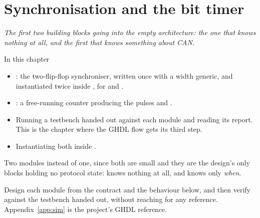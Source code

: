 
\chapter{Synchronisation and the bit timer}
\label{c12:ch}

{\large\itshape The first two building blocks going into the empty architecture: the one that knows
nothing at all, and the first that knows something about CAN.\par}

\begin{chapterbox}{In this chapter}
\begin{itemize}
  \item {}: the two-flip-flop synchroniser, written once with a width generic, and
    instantiated twice inside , for  and .
  \item {}: a free-running counter producing the pulses  and
    .
  \item Running a testbench handed out against each module and reading its report. This is the
    chapter where the GHDL flow gets its third step.
  \item Instantiating both inside .
\end{itemize}
\end{chapterbox}

Two modules instead of one, since both are small and they are the design's only blocks holding no
protocol state:  knows nothing at all, and  knows only \emph{when}.

Design each module from the contract and the behaviour below, and then verify against the testbench
handed out, without reaching for any reference. Appendix~\ref{app:sim} is the project's GHDL
reference.





